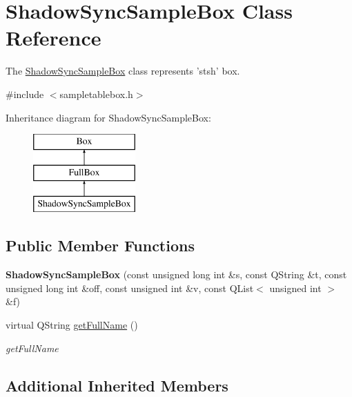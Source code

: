 \hypertarget{class_shadow_sync_sample_box}{\section{Shadow\-Sync\-Sample\-Box Class Reference}
\label{class_shadow_sync_sample_box}
}


The \hyperlink{class_shadow_sync_sample_box}{Shadow\-Sync\-Sample\-Box} class represents 'stsh' box.  




{\ttfamily \#include $<$sampletablebox.\-h$>$}

Inheritance diagram for Shadow\-Sync\-Sample\-Box\-:\begin{figure}[H]
\begin{center}
\leavevmode
\includegraphics[height=3.000000cm]{class_shadow_sync_sample_box}
\end{center}
\end{figure}
\subsection*{Public Member Functions}
\begin{DoxyCompactItemize}
\item 
\hypertarget{class_shadow_sync_sample_box_ac0c6cbaf6373411e95b27b3ca4c4d7ba}{{\bfseries Shadow\-Sync\-Sample\-Box} (const unsigned long int \&s, const Q\-String \&t, const unsigned long int \&off, const unsigned int \&v, const Q\-List$<$ unsigned int $>$ \&f)}\label{class_shadow_sync_sample_box_ac0c6cbaf6373411e95b27b3ca4c4d7ba}

\item 
virtual Q\-String \hyperlink{class_shadow_sync_sample_box_ab6644ef80649f21ac098f0d78904e9df}{get\-Full\-Name} ()
\begin{DoxyCompactList}\small\item\em get\-Full\-Name \end{DoxyCompactList}\end{DoxyCompactItemize}
\subsection*{Additional Inherited Members}


